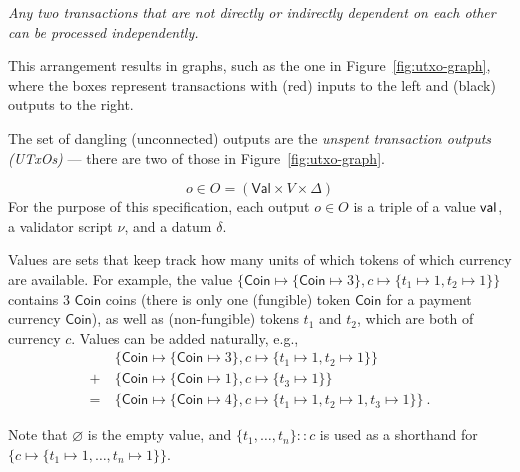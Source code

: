 \emph{Any two transactions that are not directly or indirectly dependent on each other can be processed independently.}

This arrangement results in graphs, such as the one in Figure~\ref{fig:utxo-graph},
where the boxes represent transactions with (red) inputs to the left and (black) outputs to the
right.

The set of dangling (unconnected) outputs are the \emph{unspent transaction outputs (UTxOs)} --- there are two of those in Figure~\ref{fig:utxo-graph}. 

\begin{definition}[Outputs]
$$
o \in O = (\mathsf{Val} \times V \times \Delta)
$$
For the purpose of this specification, each output \(o \in O\) is a triple of a value
$\mathsf{val}$, a validator script $\nu$, and a datum $\delta$.
\end{definition}

\begin{definition}[Values]
Values are sets that keep track how many units of which tokens of
which currency are available.  For example, the value
$\{\mathsf{Coin} \mapsto \{\mathsf{Coin} \mapsto 3\}, c \mapsto \{t_1
\mapsto 1, t_2 \mapsto 1\}\}$ contains $3$ $\mathsf{Coin}$ coins
(there is only one (fungible) token $\mathsf{Coin}$ for a payment
currency $\mathsf{Coin}$), as well as (non-fungible) tokens $t_1$ and $t_2$, which
are both of currency $c$.  Values can be added naturally, e.g.,
\begin{align*}
  & \{\mathsf{Coin} \mapsto \{\mathsf{Coin} \mapsto 3\}, c \mapsto \{t_1
    \mapsto 1, t_2 \mapsto 1\}\} \\
  + \ & \{\mathsf{Coin} \mapsto \{\mathsf{Coin} \mapsto 1\}, c \mapsto \{t_3 \mapsto 1\}\} \\
  = \ & \{\mathsf{Coin} \mapsto \{\mathsf{Coin} \mapsto 4\}, c \mapsto \{t_1
        \mapsto 1, t_2 \mapsto 1, t_3 \mapsto 1\}\} \ .
\end{align*}

Note that $\varnothing$ is the empty value, and
\(\{t_1, \ldots, t_n\} :: c\) is used as a shorthand for
\(\{c \mapsto \{t_1 \mapsto 1, \ldots, t_n \mapsto 1\}\}\). 
\end{definition}

